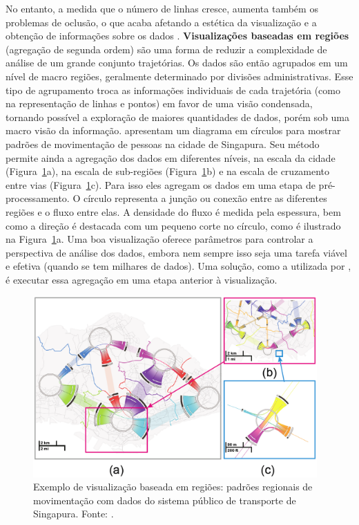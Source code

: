 No entanto, a medida que o número de linhas cresce, aumenta também os problemas
de oclusão, o que acaba afetando a estética da visualização e a obtenção de
informações sobre os dados \citep{Zhou2013}. \textbf{Visualizações baseadas em
regiões} (agregação de segunda ordem) são uma forma de reduzir a complexidade de
análise de um grande conjunto trajetórias. Os dados são então agrupados em um
nível de macro regiões, geralmente determinado por divisões administrativas.
Esse tipo de agrupamento troca as informações individuais de cada trajetória
(como na representação de linhas e pontos) em favor de uma visão condensada,
tornando possível a exploração de maiores quantidades de dados, porém sob uma
macro visão da informação. \citet{Zeng2013} apresentam um diagrama em círculos
para mostrar padrões de movimentação de pessoas na cidade de Singapura. Seu
método permite ainda a agregação dos dados em diferentes níveis, na escala da
cidade (Figura~\ref{fig:interchange-circo}a), na escala de sub-regiões
(Figura~\ref{fig:interchange-circo}b) e na escala de cruzamento entre vias
(Figura~\ref{fig:interchange-circo}c). Para isso eles agregam os dados em uma
etapa de pré-processamento. O círculo representa a junção ou conexão entre as
diferentes regiões e o fluxo entre elas. A densidade do fluxo é medida pela
espessura, bem como a direção é destacada com um pequeno corte no círculo, como
é ilustrado na Figura~\ref{fig:interchange-circo}a. Uma boa visualização oferece
parâmetros para controlar a perspectiva de análise dos dados, embora nem sempre
isso seja uma tarefa viável e efetiva (quando se tem milhares de dados). Uma solução, como a utilizada por \citet{Zeng2013},
é executar essa agregação em uma etapa anterior à visualização.

\begin{figure}[!h]
  \centering
  \includegraphics[width=0.97\textwidth]{../figuras/zeng2013-region.png}
  \caption[Exemplo de visualização baseada em regiões]{Exemplo de visualização baseada em regiões: padrões regionais de movimentação com dados do sistema público de transporte de Singapura. Fonte: \citet{Zeng2013}.}
  \label{fig:interchange-circo}
\end{figure}

